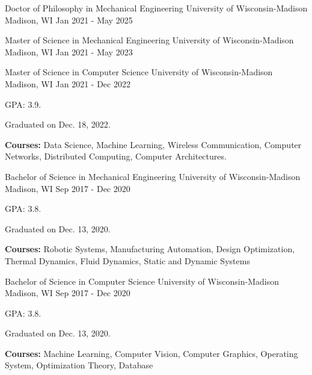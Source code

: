 

\begin{cventries}

  \cventry
    {Doctor of Philosophy in Mechanical Engineering} %
    {University of Wisconsin-Madison} %
    {Madison, WI} %
    {Jan 2021 - May 2025} %
    {}
    
  \cventry
    {Master of Science in Mechanical Engineering} %
    {University of Wisconsin-Madison} %
    {Madison, WI} %
    {Jan 2021 - May 2023} %
    {}
    
  \cventry
	{Master of Science in Computer Science} %
	{University of Wisconsin-Madison} %
	{Madison, WI} %
	{Jan 2021 - Dec 2022} %
	{
	  \begin{cvitems} %
		\item {GPA: 3.9.}
		\item {Graduated on Dec. 18, 2022.}
		\item {\textbf{Courses:} Data Science, Machine Learning, Wireless Communication, Computer Networks, Distributed Computing, Computer Architectures.}
	  \end{cvitems}
	}

  \cventry
	{Bachelor of Science in Mechanical Engineering} %
	{University of Wisconsin-Madison} %
	{Madison, WI} %
	{Sep 2017 - Dec 2020} %
	{
	  \begin{cvitems} %
		\item {GPA: 3.8.}
		\item {Graduated on Dec. 13, 2020.}
	    \item {\textbf{Courses:} Robotic Systems, Manufacturing Automation, Design Optimization, Thermal Dynamics, Fluid Dynamics, Static and Dynamic Systems}
	  \end{cvitems}
	}

  \cventry
	{Bachelor of Science in Computer Science} %
	{University of Wisconsin-Madison} %
	{Madison, WI} %
	{Sep 2017 - Dec 2020} %
	{
	  \begin{cvitems} %
		\item {GPA: 3.8.}
		\item {Graduated on Dec. 13, 2020.}
		\item {\textbf{Courses:} Machine Learning, Computer Vision, Computer Graphics, Operating System, Optimization Theory, Database}
	  \end{cvitems}
	}
\end{cventries}
